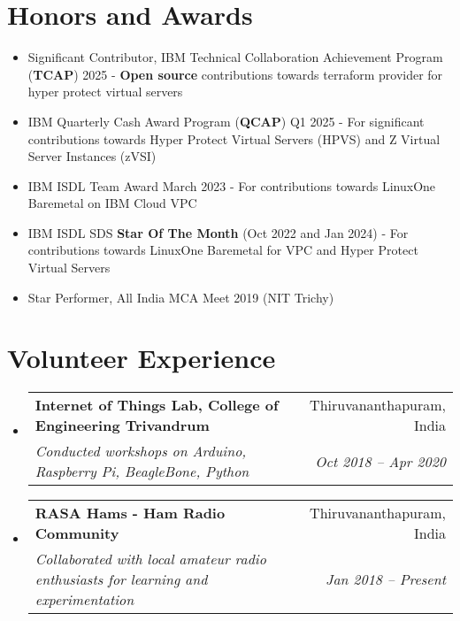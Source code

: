 \documentclass[a4paper,20pt]{article}
\makeatletter
\newcommand{\resumeSubheading}[4]{
  \vspace{-1pt}\item
  \begin{tabular*}{0.97\textwidth}{l@{\extracolsep{\fill}}r}
    \textbf{#1} & #2 \\
    \textit{#3} & \textit{#4} \\
  \end{tabular*}\vspace{-5pt}
}
\newcommand{\resumeSubHeadingListStart}{\begin{itemize}[leftmargin=*]}
\newcommand{\resumeSubHeadingListEnd}{\end{itemize}}
\makeatother
\begin{document}
\vspace{+5pt}
\section{Honors and Awards}
    \begin{itemize}
        \item Significant Contributor, IBM Technical Collaboration Achievement Program (\textbf{TCAP}) 2025 - \textbf{Open source} contributions towards terraform provider for hyper protect virtual servers
        \item IBM Quarterly Cash Award Program (\textbf{QCAP}) Q1 2025 - For significant contributions towards Hyper Protect Virtual Servers (HPVS) and Z Virtual Server Instances (zVSI)
        \item IBM ISDL Team Award March 2023 - For contributions towards LinuxOne Baremetal on IBM Cloud VPC 
        \item IBM ISDL SDS \textbf{Star Of The Month} (Oct 2022 and Jan 2024) - For contributions towards LinuxOne Baremetal for VPC and Hyper Protect Virtual Servers
        \item Star Performer, All India MCA Meet 2019 (NIT Trichy)
    \end{itemize}

\vspace{+5pt}
\section{Volunteer Experience}
\resumeSubHeadingListStart
    \resumeSubheading
        {Internet of Things Lab, College of Engineering Trivandrum}{Thiruvananthapuram, India}
        {Conducted workshops on Arduino, Raspberry Pi, BeagleBone, Python}{Oct 2018 -- Apr 2020}
    \resumeSubheading
        {RASA Hams - Ham Radio Community}{Thiruvananthapuram, India}
        {Collaborated with local amateur radio enthusiasts for learning and experimentation}{Jan 2018 -- Present}
    \resumeSubHeadingListEnd
\end{document}
